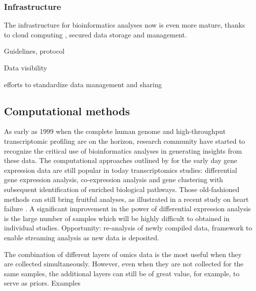 \documentclass[letter]{bioinfo}
\begin{document}
\subsubsection{Infrastructure}

The infrastructure for bioinformatics analyses now is even more mature, thanks to cloud computing \citep{Langmead:2018:Cloud}, secured data storage and management.

Guidelines, protocol


Data visibility


efforts to standardize data management and sharing

%
%
%
%

\subsection{Computational methods}


As early as 1999 when the complete human genome and high-throughput transcriptomic profiling are on the horizon, research community have started to recognize the critical use of bioinformatics analyses in generating insights from these data. The computational approaches outlined by \cite{Claverie:1999:Computational} for the early day gene expression data are still popular in today transcriptomics studies: differential gene expression analysis, co-expression analysis and gene clustering with subsequent identification of enriched biological pathways. Those old-fashioned methods can still bring fruitful analyses, as illustrated in a recent study on heart failure \citep{Santolini:2018:personalized}. A significant improvement in the power of differential expression analysis is the large number of samples which will be highly difficult to obtained in individual studies. Opportunity: re-analysis of newly compiled data, framework to enable streaming analysis as new data is deposited.


The combination of different layers of omics data is the most useful when they are collected simultaneously. However, even when they are not collected for the same samples, the additional layers can still be of great value, for example, to serve as priors. Examples
\end{document}
